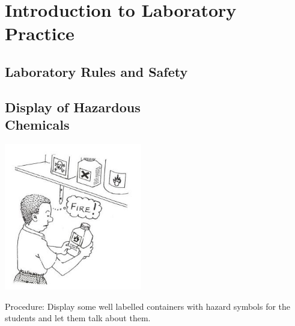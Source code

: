 \section{Introduction to Laboratory Practice} 

\begin{multicols}{2}



\section*{Laboratory Rules and Safety} 


\subsection[Display of Hazardous Chemicals]{Display of Hazardous \hfill \\ Chemicals}

\begin{center}
\includegraphics[width=0.45\textwidth]{./img/source/display-chemicals.jpg}
\end{center}

\begin{description*}
\item[Procedure:]{Display some well labelled containers with
hazard symbols for the students and let them
talk about them.}
\end{description*}


\end{multicols}
